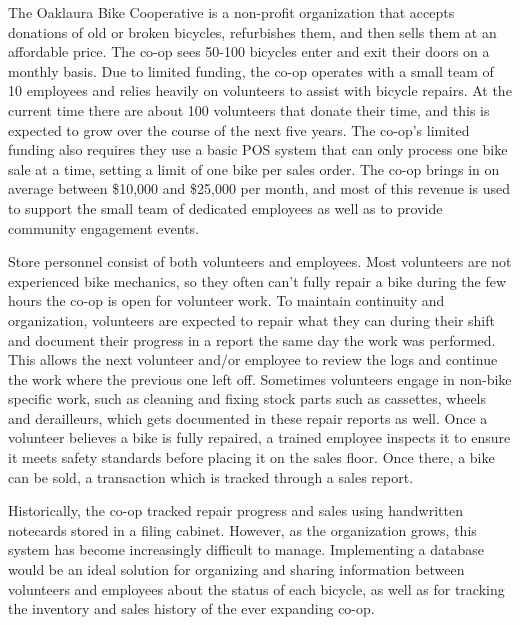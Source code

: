 \documentclass{article}
\begin{document}
\begin{tcolorbox}[colback=secondarycolor, colframe=primarycolor, arc=5mm]
\begingroup
The Oaklaura Bike Cooperative is a non-profit organization that accepts donations of old or broken bicycles, refurbishes them, and then sells them at an affordable price. The co-op sees 50-100 bicycles enter and exit their doors on a monthly basis. Due to limited funding, the co-op operates with a small team of 10 employees and relies heavily on volunteers to assist with bicycle repairs. At the current time there are about 100 volunteers that donate their time, and this is expected to grow over the course of the next five years. The co-op’s limited funding also requires they use a basic POS system that can only process one bike sale at a time, setting a limit of one bike per sales order. The co-op brings in on average between \$10,000 and \$25,000 per month, and most of this revenue is used to support the small team of dedicated employees as well as to provide community engagement events. 

\vspace{0.2cm}

Store personnel consist of both volunteers and employees. Most volunteers are not experienced bike mechanics, so they often can't fully repair a bike during the few hours the co-op is open for volunteer work. To maintain continuity and organization, volunteers are expected to repair what they can during their shift and document their progress in a report the same day the work was performed. This allows the next volunteer and/or employee to review the logs and continue the work where the previous one left off. Sometimes volunteers engage in non-bike specific work, such as cleaning and fixing stock parts such as cassettes, wheels and derailleurs, which gets documented in these repair reports as well. Once a volunteer believes a bike is fully repaired, a trained employee inspects it to ensure it meets safety standards before placing it on the sales floor. Once there, a bike can be sold, a transaction which is tracked through a sales report. 

\vspace{0.2cm}

Historically, the co-op tracked repair progress and sales using handwritten notecards stored in a filing cabinet. However, as the organization grows, this system has become increasingly difficult to manage. Implementing a database would be an ideal solution for organizing and sharing information between volunteers and employees about the status of each bicycle, as well as for tracking the inventory and sales history of the ever expanding co-op.

\endgroup
\end{tcolorbox}
\end{document}
